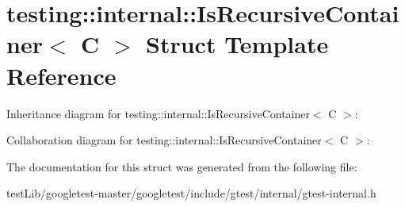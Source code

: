 \hypertarget{structtesting_1_1internal_1_1IsRecursiveContainer}{}\section{testing\+:\+:internal\+:\+:Is\+Recursive\+Container$<$ C $>$ Struct Template Reference}
\label{structtesting_1_1internal_1_1IsRecursiveContainer}


Inheritance diagram for testing\+:\+:internal\+:\+:Is\+Recursive\+Container$<$ C $>$\+:


Collaboration diagram for testing\+:\+:internal\+:\+:Is\+Recursive\+Container$<$ C $>$\+:


The documentation for this struct was generated from the following file\+:\begin{DoxyCompactItemize}
\item 
test\+Lib/googletest-\/master/googletest/include/gtest/internal/gtest-\/internal.\+h\end{DoxyCompactItemize}
